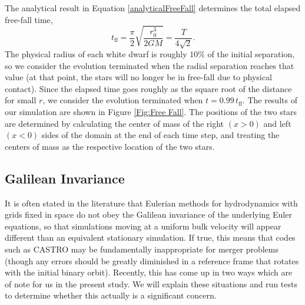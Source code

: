 \documentclass[12pt,preprint]{aastex}
\begin{document}
The analytical result in Equation \ref{analyticalFreeFall} determines
the total elapsed free-fall time,
\[
  t_{\text{ff}} = \frac{\pi}{2} \sqrt{\frac{r_0^3}{2GM}} = \frac{T}{4\sqrt{2}}.
\]
The physical radius of each white dwarf is roughly $10\%$ of the
initial separation, so we consider the evolution terminated when the
radial separation reaches that value (at that point, the stars will no
longer be in free-fall due to physical contact). Since the elapsed
time goes roughly as the square root of the distance for small $r$, we
consider the evolution terminated when $t = 0.99\, t_{\text{ff}}$. The
results of our simulation are shown in Figure \ref{Fig:Free Fall}. The
positions of the two stars are determined by calculating the center of
mass of the right $(x > 0)$ and left $(x < 0)$ sides of the domain at 
the end of each time step, and treating the centers of mass as the 
respective location of the two stars.

\subsection{Galilean Invariance}\label{sec:galileo}

It is often stated in the literature that Eulerian methods for hydrodynamics with grids fixed in space do not obey the Galilean invariance of the underlying Euler equations, so that simulations moving at a uniform bulk velocity will appear different than an equivalent stationary simulation. If true, this means that codes such as CASTRO may be fundamentally inappropriate for merger problems (though any errors should be greatly diminished in a reference frame that rotates with the initial binary orbit). Recently, this has come up in two ways which are of note for us in the present study. We will explain these situations and run tests to determine whether this actually is a significant concern.
\end{document}
